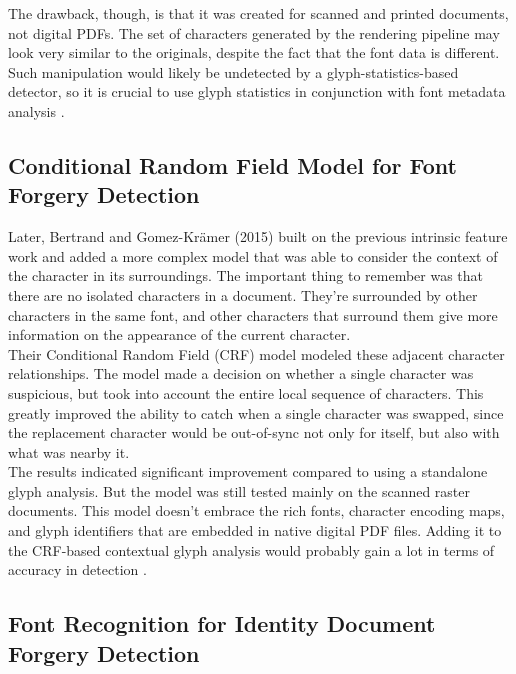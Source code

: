 \noindent The drawback, though, is that it was created for scanned and printed documents, not digital PDFs. The set of characters generated by the rendering pipeline may look very similar to the originals, despite the fact that the font data is different. Such manipulation would likely be undetected by a glyph-statistics-based detector, so it is crucial to use glyph statistics in conjunction with font metadata analysis \cite{Bertrand2013Intrinsic}.\\

\subsection{Conditional Random Field Model for Font Forgery Detection}

\noindent Later, Bertrand and Gomez-Krämer (2015) built on the previous intrinsic feature work and added a more complex model that was able to consider the context of the character in its surroundings. The important thing to remember was that there are no isolated characters in a document. They're surrounded by other characters in the same font, and other characters that surround them give more information on the appearance of the current character.\\

\noindent Their Conditional Random Field (CRF) model modeled these adjacent character relationships. The model made a decision on whether a single character was suspicious, but took into account the entire local sequence of characters. This greatly improved the ability to catch when a single character was swapped, since the replacement character would be out-of-sync not only for itself, but also with what was nearby it.\\

\noindent The results indicated significant improvement compared to using a standalone glyph analysis. But the model was still tested mainly on the scanned raster documents. This model doesn't embrace the rich fonts, character encoding maps, and glyph identifiers that are embedded in native digital PDF files. Adding it to the CRF-based contextual glyph analysis would probably gain a lot in terms of accuracy in detection \cite{Bertrand2015CRF}.\\

\subsection{Font Recognition for Identity Document Forgery Detection}

